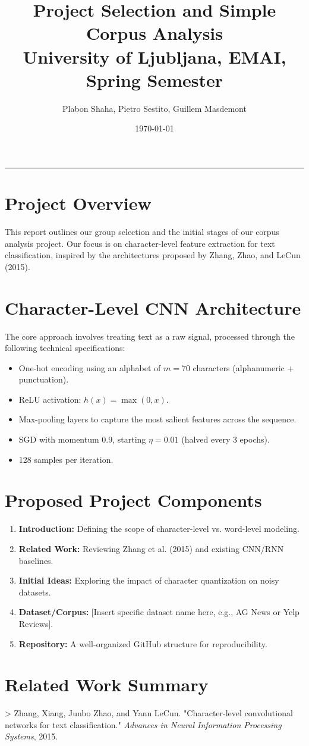 \documentclass[11pt, a4paper]{article}
\title{\textbf{Project Selection and Simple Corpus Analysis} \\ 
\large University of Ljubljana, EMAI, Spring Semester}
\author{Plabon Shaha, Pietro Sestito, Guillem Masdemont}
\date{\today}
\makeatletter
\renewcommand{\maketitle}{
  \begin{flushleft}
    {\huge \textbf{\@title} \par}
    \vspace{0.5cm}
    {\large \@author \par}
    \vspace{0.2cm}
    {\@date \par}
    \vspace{1cm}
    \hrule
  \end{flushleft}
}
\makeatother
\begin{document}
\maketitle

\section{Project Overview}
This report outlines our group selection and the initial stages of our corpus analysis project. Our focus is on character-level feature extraction for text classification, inspired by the architectures proposed by Zhang, Zhao, and LeCun (2015).

\section{Character-Level CNN Architecture}
The core approach involves treating text as a raw signal, processed through the following technical specifications:

\begin{itemize}[leftmargin=1.5in, labelsep=0.5in]
    \item[\textbf{Quantization}] One-hot encoding using an alphabet of $m=70$ characters (alphanumeric + punctuation).
    \item[\textbf{Activation}] ReLU activation: $h(x) = \max(0, x)$.
    \item[\textbf{Pooling}] Max-pooling layers to capture the most salient features across the sequence.
    \item[\textbf{Optimization}] SGD with momentum 0.9, starting $\eta=0.01$ (halved every 3 epochs).
    \item[\textbf{Minibatch}] 128 samples per iteration.
\end{itemize}

\section{Proposed Project Components}
\begin{enumerate}
    \item \textbf{Introduction:} Defining the scope of character-level vs. word-level modeling.
    \item \textbf{Related Work:} Reviewing Zhang et al. (2015) and existing CNN/RNN baselines.
    \item \textbf{Initial Ideas:} Exploring the impact of character quantization on noisy datasets.
    \item \textbf{Dataset/Corpus:} [Insert specific dataset name here, e.g., AG News or Yelp Reviews].
    \item \textbf{Repository:} A well-organized GitHub structure for reproducibility.
\end{enumerate}

\section{Related Work Summary}
> Zhang, Xiang, Junbo Zhao, and Yann LeCun. "Character-level convolutional networks for text classification." \textit{Advances in Neural Information Processing Systems}, 2015.
\end{document}
